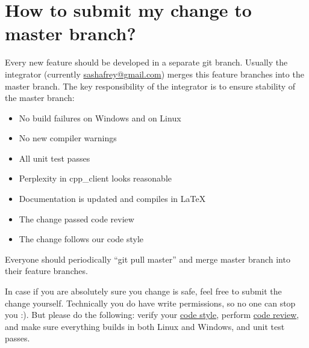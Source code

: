 \documentclass[11pt,a4paper,twoside]{report}
\begin{document}
\section{How to submit my change to master branch?}
\label{label:how_to_submit}
Every new feature should be developed in a separate git branch.
Usually the integrator (currently \href{mailto:sashafrey@gmail.com}{sashafrey@gmail.com})
merges this feature branches into the master branch.
The key responsibility of the integrator is to ensure stability of the master branch:
\begin{itemize}
    \item No build failures on Windows and on Linux
    \item No new compiler warnings
    \item All unit test passes
    \item Perplexity in cpp\_client looks reasonable
    \item Documentation is updated and compiles in LaTeX
    \item The change passed code review
    \item The change follows our code style
\end{itemize}
Everyone should periodically ``git pull master'' and merge master branch
into their feature branches.

In case if you are absolutely sure you change is safe, feel free to submit the change yourself.
Technically you do have write permissions, so no one can stop you :).
But please do the following:
verify your \hyperref[label:code_style]{code style},
perform \hyperref[label:code_review]{code review},
and make sure everything builds in both Linux and Windows, and unit test passes.
\end{document}

